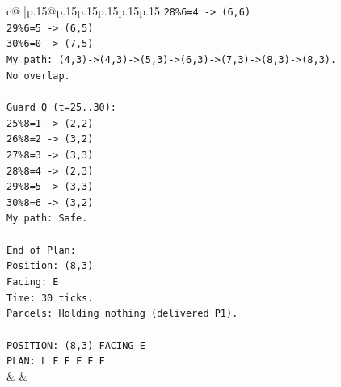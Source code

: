 \documentclass{article}
\begin{document}
{\begin{supertabular}{c@{$\;$}|p{.15\linewidth}@{}p{.15\linewidth}p{.15\linewidth}p{.15\linewidth}p{.15\linewidth}p{.15\linewidth}}
{{{\texttt{28\%6=4 {-}> (6,6)} \\
\texttt{29\%6=5 {-}> (6,5)} \\
\texttt{30\%6=0 {-}> (7,5)} \\
\texttt{My path: (4,3){-}>(4,3){-}>(5,3){-}>(6,3){-}>(7,3){-}>(8,3){-}>(8,3).} \\
\texttt{No overlap.} \\
\\ 
\texttt{Guard Q (t=25..30):} \\
\texttt{25\%8=1 {-}> (2,2)} \\
\texttt{26\%8=2 {-}> (3,2)} \\
\texttt{27\%8=3 {-}> (3,3)} \\
\texttt{28\%8=4 {-}> (2,3)} \\
\texttt{29\%8=5 {-}> (3,3)} \\
\texttt{30\%8=6 {-}> (3,2)} \\
\texttt{My path: Safe.} \\
\\ 
\texttt{End of Plan:} \\
\texttt{Position: (8,3)} \\
\texttt{Facing: E} \\
\texttt{Time: 30 ticks.} \\
\texttt{Parcels: Holding nothing (delivered P1).} \\
\\ 
\texttt{POSITION: (8,3) FACING E} \\
\texttt{PLAN: L F F F F F} \\
            }
        }
    }
    & & \\ \\


\end{supertabular}}
\end{document}
